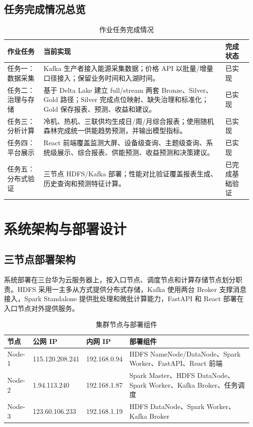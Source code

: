 \documentclass[UTF8,11pt,a4paper]{ctexart}
\begin{document}
\subsection{任务完成情况总览}

\begin{table}[H]
\centering
\small
\begin{tabularx}{\textwidth}{p{2.2cm}Yp{2cm}}
\toprule
作业任务 & 当前实现 & 完成状态 \\
\midrule
任务一：数据采集 & Kafka 生产者接入能源采集数据；价格 API 以批量/增量口径接入；保留业务时间和入湖时间。 & 已实现 \\
任务二：治理与存储 & 基于 Delta Lake 建立 full/stream 两套 Bronze、Silver、Gold 路径；Silver 完成点位映射、缺失治理和标准化；Gold 保存报表、预测、收益和建议。 & 已实现 \\
任务三：分析计算 & 冷机、热机、三联供均生成日/周/月综合报表；使用随机森林完成统一供能趋势预测，并输出模型指标。 & 已实现 \\
任务四：平台展示 & React 前端覆盖监测大屏、设备级查询、主题级查询、系统级展示、综合报表、供能预测、收益预测和决策建议。 & 已实现 \\
任务五：分布式验证 & 三节点 HDFS/Kafka 部署；性能对比验证覆盖报表生成、历史查询和预测特征计算。 & 已完成基础验证 \\
\bottomrule
\end{tabularx}
\caption{作业任务完成情况}
\end{table}

\section{系统架构与部署设计}

\subsection{三节点部署架构}

系统部署在三台华为云服务器上，按入口节点、调度节点和计算存储节点划分职责。HDFS 采用一主多从方式提供分布式存储，Kafka 使用两台 Broker 支撑消息接入，Spark Standalone 提供批处理和微批计算能力，FastAPI 和 React 部署在入口节点对外提供服务。



\begin{table}[H]
\centering
\small
\begin{tabularx}{\textwidth}{p{1.7cm}p{2.7cm}p{2.4cm}Y}
\toprule
节点 & 公网 IP & 内网 IP & 部署组件 \\
\midrule
Node-1 & 115.120.208.241 & 192.168.0.94 & HDFS NameNode/DataNode、Spark Worker、FastAPI、React 前端 \\
Node-2 & 1.94.113.240 & 192.168.1.87 & Spark Master、HDFS DataNode、Spark Worker、Kafka Broker、任务调度 \\
Node-3 & 123.60.106.233 & 192.168.1.19 & HDFS DataNode、Spark Worker、Kafka Broker \\
\bottomrule
\end{tabularx}
\caption{集群节点与部署组件}
\end{table}
\end{document}
